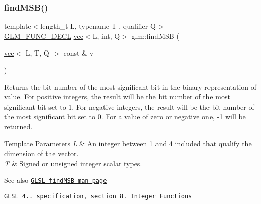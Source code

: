\subsubsection{\texorpdfstring{find\+M\+S\+B()}{findMSB()}\hspace{0.1cm}{\footnotesize\ttfamily [2/2]}}
{\footnotesize\ttfamily template$<$length\+\_\+t L, typename T , qualifier Q$>$ \\
\mbox{\hyperlink{setup_8hpp_ab2d052de21a70539923e9bcbf6e83a51}{G\+L\+M\+\_\+\+F\+U\+N\+C\+\_\+\+D\+E\+CL}} \mbox{\hyperlink{structglm_1_1vec}{vec}}$<$L, int, Q$>$ glm\+::find\+M\+SB (\begin{DoxyParamCaption}\item[{\mbox{\hyperlink{structglm_1_1vec}{vec}}$<$ L, T, Q $>$ const \&}]{v }\end{DoxyParamCaption})}

Returns the bit number of the most significant bit in the binary representation of value. For positive integers, the result will be the bit number of the most significant bit set to 1. For negative integers, the result will be the bit number of the most significant bit set to 0. For a value of zero or negative one, -\/1 will be returned.


\begin{DoxyTemplParams}{Template Parameters}
{\em L} & An integer between 1 and 4 included that qualify the dimension of the vector. \\
\hline
{\em T} & Signed or unsigned integer scalar types.\\
\hline
\end{DoxyTemplParams}
\begin{DoxySeeAlso}{See also}
\href{http://www.opengl.org/sdk/docs/manglsl/xhtml/findMSB.xml}{\tt G\+L\+SL find\+M\+SB man page} 

\href{http://www.opengl.org/registry/doc/GLSLangSpec.4.20.8.pdf}{\tt G\+L\+SL 4.. specification, section 8. Integer Functions} 
\end{DoxySeeAlso}
\mbox{\label{group__core__func__integer_gac0c510a70e852f57594a9141848642e3}} 
